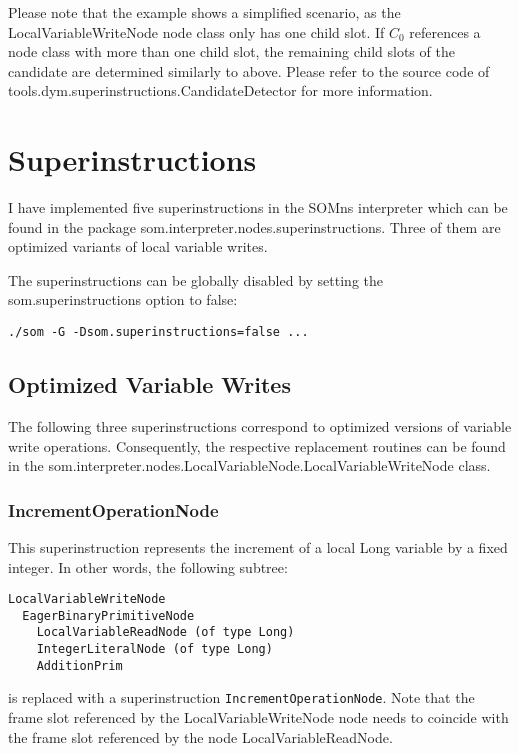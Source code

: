\documentclass[10pt,a4paper]{article}
\begin{document}
Please note that the example shows a simplified scenario, as the \textsf{LocalVariableWriteNode} node class only has one child slot. If $C_0$ references a node class with more than one child slot, the remaining child slots of the candidate are determined similarly to above. Please refer to the source code of \textsf{tools.dym.superinstructions.CandidateDetector} for more information.

\section{Superinstructions}\label{sec:superinst}

I have implemented five superinstructions in the SOMns interpreter which can be found in the package \textsf{som.interpreter.{\allowbreak}nodes.superinstructions}. Three of them are optimized variants of local variable writes.

The superinstructions can be globally disabled by setting the \textsf{som.superinstructions} option to \textsf{false}:

\begin{verbatim}
./som -G -Dsom.superinstructions=false ...
\end{verbatim}

\subsection{Optimized Variable Writes}

The following three superinstructions correspond to optimized versions of variable write operations. Consequently, the respective replacement routines can be found in the \textsf{som.interpreter.{\allowbreak}nodes.LocalVariableNode.{\allowbreak}LocalVariableWriteNode} class.

\subsubsection{IncrementOperationNode}

This superinstruction represents the increment of a local \textsf{Long} variable by a fixed integer.
In other words, the following subtree:

\begin{verbatim}
LocalVariableWriteNode
  EagerBinaryPrimitiveNode
    LocalVariableReadNode (of type Long)
    IntegerLiteralNode (of type Long)
    AdditionPrim
\end{verbatim}

is replaced with a superinstruction \verb|IncrementOperationNode|. Note that the frame slot referenced by the \textsf{LocalVariableWriteNode} node needs to coincide with the frame slot referenced by the node \textsf{LocalVariableReadNode}.
\end{document}
